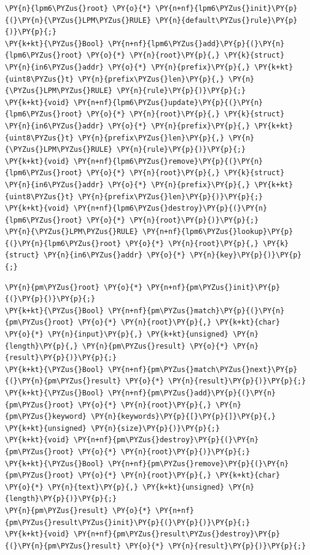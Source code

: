 \begin{Verbatim}[commandchars=\\\{\}]
\PY{n}{lpm6\PYZus{}root} \PY{o}{*} \PY{n+nf}{lpm6\PYZus{}init}\PY{p}{(}\PY{n}{\PYZus{}LPM\PYZus{}RULE} \PY{n}{default\PYZus{}rule}\PY{p}{)}\PY{p}{;}
\PY{k+kt}{\PYZus{}Bool} \PY{n+nf}{lpm6\PYZus{}add}\PY{p}{(}\PY{n}{lpm6\PYZus{}root} \PY{o}{*} \PY{n}{root}\PY{p}{,} \PY{k}{struct} \PY{n}{in6\PYZus{}addr} \PY{o}{*} \PY{n}{prefix}\PY{p}{,} \PY{k+kt}{uint8\PYZus{}t} \PY{n}{prefix\PYZus{}len}\PY{p}{,} \PY{n}{\PYZus{}LPM\PYZus{}RULE} \PY{n}{rule}\PY{p}{)}\PY{p}{;}
\PY{k+kt}{void} \PY{n+nf}{lpm6\PYZus{}update}\PY{p}{(}\PY{n}{lpm6\PYZus{}root} \PY{o}{*} \PY{n}{root}\PY{p}{,} \PY{k}{struct} \PY{n}{in6\PYZus{}addr} \PY{o}{*} \PY{n}{prefix}\PY{p}{,} \PY{k+kt}{uint8\PYZus{}t} \PY{n}{prefix\PYZus{}len}\PY{p}{,} \PY{n}{\PYZus{}LPM\PYZus{}RULE} \PY{n}{rule}\PY{p}{)}\PY{p}{;}
\PY{k+kt}{void} \PY{n+nf}{lpm6\PYZus{}remove}\PY{p}{(}\PY{n}{lpm6\PYZus{}root} \PY{o}{*} \PY{n}{root}\PY{p}{,} \PY{k}{struct} \PY{n}{in6\PYZus{}addr} \PY{o}{*} \PY{n}{prefix}\PY{p}{,} \PY{k+kt}{uint8\PYZus{}t} \PY{n}{prefix\PYZus{}len}\PY{p}{)}\PY{p}{;}
\PY{k+kt}{void} \PY{n+nf}{lpm6\PYZus{}destroy}\PY{p}{(}\PY{n}{lpm6\PYZus{}root} \PY{o}{*} \PY{n}{root}\PY{p}{)}\PY{p}{;}
\PY{n}{\PYZus{}LPM\PYZus{}RULE} \PY{n+nf}{lpm6\PYZus{}lookup}\PY{p}{(}\PY{n}{lpm6\PYZus{}root} \PY{o}{*} \PY{n}{root}\PY{p}{,} \PY{k}{struct} \PY{n}{in6\PYZus{}addr} \PY{o}{*} \PY{n}{key}\PY{p}{)}\PY{p}{;}
\end{Verbatim}

\begin{Verbatim}[commandchars=\\\{\}]
\PY{n}{pm\PYZus{}root} \PY{o}{*} \PY{n+nf}{pm\PYZus{}init}\PY{p}{(}\PY{p}{)}\PY{p}{;}
\PY{k+kt}{\PYZus{}Bool} \PY{n+nf}{pm\PYZus{}match}\PY{p}{(}\PY{n}{pm\PYZus{}root} \PY{o}{*} \PY{n}{root}\PY{p}{,} \PY{k+kt}{char} \PY{o}{*} \PY{n}{input}\PY{p}{,} \PY{k+kt}{unsigned} \PY{n}{length}\PY{p}{,} \PY{n}{pm\PYZus{}result} \PY{o}{*} \PY{n}{result}\PY{p}{)}\PY{p}{;}
\PY{k+kt}{\PYZus{}Bool} \PY{n+nf}{pm\PYZus{}match\PYZus{}next}\PY{p}{(}\PY{n}{pm\PYZus{}result} \PY{o}{*} \PY{n}{result}\PY{p}{)}\PY{p}{;}
\PY{k+kt}{\PYZus{}Bool} \PY{n+nf}{pm\PYZus{}add}\PY{p}{(}\PY{n}{pm\PYZus{}root} \PY{o}{*} \PY{n}{root}\PY{p}{,} \PY{n}{pm\PYZus{}keyword} \PY{n}{keywords}\PY{p}{[}\PY{p}{]}\PY{p}{,} \PY{k+kt}{unsigned} \PY{n}{size}\PY{p}{)}\PY{p}{;}
\PY{k+kt}{void} \PY{n+nf}{pm\PYZus{}destroy}\PY{p}{(}\PY{n}{pm\PYZus{}root} \PY{o}{*} \PY{n}{root}\PY{p}{)}\PY{p}{;}
\PY{k+kt}{\PYZus{}Bool} \PY{n+nf}{pm\PYZus{}remove}\PY{p}{(}\PY{n}{pm\PYZus{}root} \PY{o}{*} \PY{n}{root}\PY{p}{,} \PY{k+kt}{char} \PY{o}{*} \PY{n}{text}\PY{p}{,} \PY{k+kt}{unsigned} \PY{n}{length}\PY{p}{)}\PY{p}{;}
\PY{n}{pm\PYZus{}result} \PY{o}{*} \PY{n+nf}{pm\PYZus{}result\PYZus{}init}\PY{p}{(}\PY{p}{)}\PY{p}{;}
\PY{k+kt}{void} \PY{n+nf}{pm\PYZus{}result\PYZus{}destroy}\PY{p}{(}\PY{n}{pm\PYZus{}result} \PY{o}{*} \PY{n}{result}\PY{p}{)}\PY{p}{;}
\end{Verbatim}

